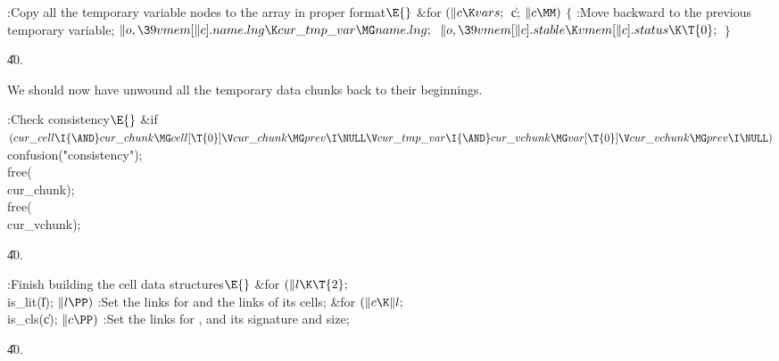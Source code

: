 \B{}:Copy all the temporary variable nodes to the  array in proper format\X${}\E{}$\6
\&{for} ${}(\|c\K\\{vars};{}$ \|c; ${}\|c\MM){}$\5
${}\{{}$\1\6
:Move  backward to the previous temporary variable\X;%
\6
${}\|o,\39\\{vmem}[\|c].\\{name}.\\{lng}\K\\{cur\_tmp\_var}\MG\\{name}.%
\\{lng};{}$\6
${}\|o,\39\\{vmem}[\|c].\\{stable}\K\\{vmem}[\|c].\\{status}\K\T{0};{}$\6
\4${}\}{}$\2\par
\U40.\fi

We should now have unwound all the temporary data chunks
back to their
beginnings.

\Y\B\4:Check consistency\X${}\E{}$\6
\&{if} ${}(\\{cur\_cell}\I{\AND}\\{cur\_chunk}\MG\\{cell}[\T{0}]\V\\{cur%
\_chunk}\MG\\{prev}\I\NULL\V\\{cur\_tmp\_var}\I{\AND}\\{cur\_vchunk}\MG\\{var}[%
\T{0}]\V\\{cur\_vchunk}\MG\\{prev}\I\NULL){}$\1\5
\\{confusion}(\.{"consistency"});\2\6
\\{free}(\\{cur\_chunk});\5
\\{free}(\\{cur\_vchunk});\par
\U40.\fi

\B{}:Finish building the cell data structures\X${}\E{}$\6
\&{for} ${}(\|l\K\T{2};{}$ \\{is\_lit}(\|l); ${}\|l\PP){}$\1\5
:Set the  links for  and the  links of its
cells\X;\2\6
\&{for} ${}(\|c\K\|l;{}$ \\{is\_cls}(\|c); ${}\|c\PP){}$\1\5
:Set the  links for , and its signature and size\X;\2%
\par
\U40.\fi

